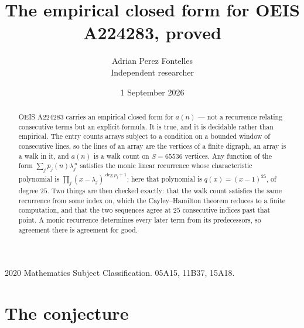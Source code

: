 \documentclass[11pt,a4paper]{article}
\title{The empirical closed form for OEIS A224283, proved}
\author{Adrian Perez Fontelles\\ \small Independent researcher}
\date{1 September 2026}
\theoremstyle{plain}
\theoremstyle{definition}
\begin{document}
\maketitle

\begin{abstract}
OEIS A224283 carries an empirical closed form for $a(n)$ --- not a recurrence relating
consecutive terms but an explicit formula. It is true, and it is decidable rather than
empirical. The entry counts arrays subject to a condition on a bounded window of consecutive lines, so the lines of an array are the
vertices of a finite digraph, an array is a walk in it, and $a(n)$ is a walk count on
$S=65536$ vertices. Any function of the form $\sum_j p_j(n)\lambda_j^{\,n}$ satisfies the
monic linear recurrence whose characteristic polynomial is
$\prod_j(x-\lambda_j)^{\deg p_j+1}$; here that polynomial is $q(x)=(x-1)^{25}$, of degree
$25$. Two things are then checked exactly: that the walk count satisfies the same
recurrence from some index on, which the Cayley--Hamilton theorem reduces to a finite
computation, and that the two sequences agree at $25$ consecutive indices past that
point. A monic recurrence determines every later term from its predecessors, so agreement
there is agreement for good.
\end{abstract}

\noindent\small 2020 Mathematics Subject Classification. 05A15, 11B37, 15A18.\normalsize

\section{The conjecture}
\end{document}
